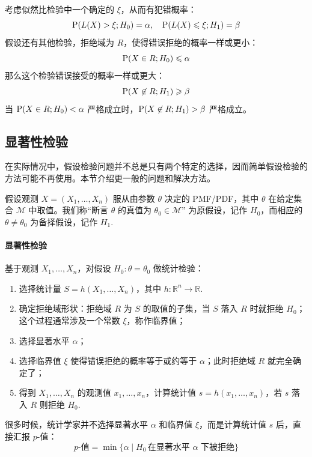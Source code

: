 \begin{lemma}
考虑似然比检验中一个确定的 $\xi$，从而有犯错概率：
\[
\mathrm{P}(L(X)>\xi;H_0)=\alpha,\quad\mathrm{P}(L(X)\leqslant\xi;H_1)=\beta
\]
假设还有其他检验，拒绝域为 $R$，使得错误拒绝的概率一样或更小：
\[
\mathrm{P}(X\in R;H_0)\leqslant\alpha
\]
那么这个检验错误接受的概率一样或更大：
\[
\mathrm{P}(X\not\in R;H_1)\geqslant\beta
\]
当 $\mathrm{P}(X\in R;H_0)<\alpha$ 严格成立时，$\mathrm{P}(X\not\in R;H_1)>\beta$ 严格成立。
\end{lemma}


\subsection{显著性检验}

在实际情况中，假设检验问题并不总是只有两个特定的选择，因而简单假设检验的方法可能不再使用。本节介绍更一般的问题和解决方法。

假设观测 $X=(X_1,\ldots,X_n)$ 服从由参数 $\theta$ 决定的 PMF/PDF，其中 $\theta$ 在给定集合 $\mathcal M$ 中取值。我们称“断言 $\theta$ 的真值为 $\theta_0\in\mathcal M$” 为原假设，记作 $H_0$，而相应的 $\theta\neq\theta_0$ 为备择假设，记作 $H_1$.

\paragraph{显著性检验}
基于观测 $X_1,\ldots,X_n$，对假设 $H_0:\theta=\theta_0$ 做统计检验：
\begin{enumerate}
    \item 选择统计量 $S=h(X_1,\ldots,X_n)$，其中 $h:\mathbb R^n\to\mathbb R$.
    \item 确定拒绝域形状：拒绝域 $R$ 为 $S$ 的取值的子集，当 $S$ 落入 $R$ 时就拒绝 $H_0$；这个过程通常涉及一个常数 $\xi$，称作临界值；
    \item 选择显著水平 $\alpha$；
    \item 选择临界值 $\xi$ 使得错误拒绝的概率等于或约等于 $\alpha$；此时拒绝域 $R$ 就完全确定了；
    \item 得到 $X_1,\ldots,X_n$ 的观测值 $x_1,\ldots,x_n$，计算统计值 $s=h(x_1,\ldots,x_n)$，若 $s$ 落入 $R$ 则拒绝 $H_0$.
\end{enumerate}

\begin{com}
很多时候，统计学家并不选择显著水平 $\alpha$ 和临界值 $\xi$，而是计算统计值 $s$ 后，直接汇报 $p$-值：
\[
    p\text{-值}=\min\{\alpha\mid H_0\,\text{在显著水平 $\alpha$ 下被拒绝}\}
\]
\end{com}

